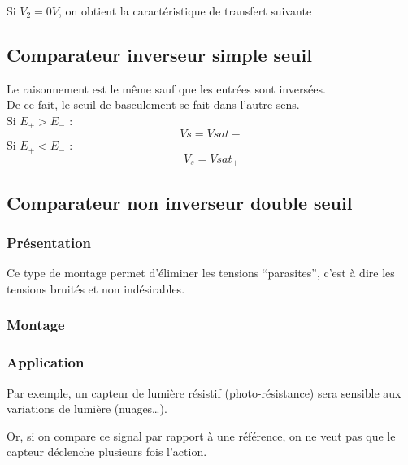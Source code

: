 Si $V_2=0V$, on obtient la caractéristique de transfert suivante  



\subsection{Comparateur inverseur simple seuil}

Le raisonnement est le même sauf que les entrées sont inversées. \\
De ce fait, le seuil de basculement se fait dans l’autre sens. \\

Si $E_+>E_-$ :
$$Vs=Vsat-$$
Si $E_+<E_-$ :
$$V_s=Vsat_+$$

\subsection{Comparateur non inverseur double seuil}


\subsubsection{Présentation}

Ce type de montage permet d’éliminer les tensions “parasites”, c’est à dire les tensions bruités et non indésirables. \\

\subsubsection{Montage}


\subsubsection{Application}

Par exemple, un capteur de lumière résistif (photo-résistance) sera sensible aux variations de lumière (nuages…). \\


Or, si on compare ce signal par rapport à une référence, on ne veut pas que le capteur déclenche plusieurs fois l’action.


